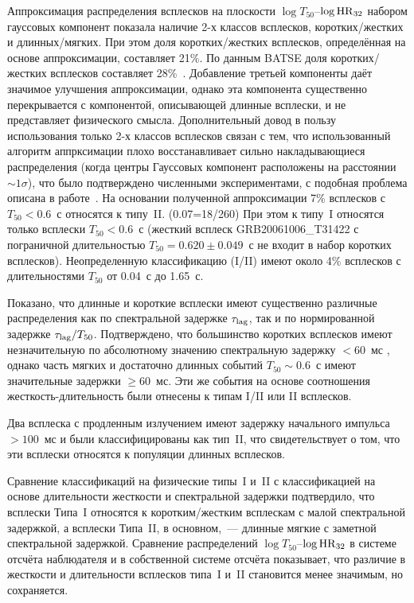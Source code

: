 Аппроксимация распределения всплесков на плоскости $\log T_{50}$--$\log {\mathrm{HR}}_{32}$ 
набором гауссовых компонент показала наличие 2-х классов всплесков, коротких/жестких 
и длинных/мягких. При этом доля коротких/жестких всплесков, определённая на основе 
аппроксимации, составляет 21\%. По данным  BATSE доля коротких/жестких всплесков 
составляет 28\%~\citep{Horvath_2002}.  
Добавление третьей компоненты даёт значимое улучшения аппроксимации, однако эта 
компонента существенно перекрывается с компонентой, описывающей длинные всплески, 
и не представляет физического смысла. Дополнительный довод в пользу использования
только 2-х классов всплесков связан с тем, что использованный алгоритм аппрксимации
плохо восстанавливает сильно накладывающиеся распределения 
(когда центры Гауссовых компонент расположены на расстоянии $\sim 1\sigma$),
что было подтверждено численными экспериментами, с подобная проблема 
описана в работе~\citep{Igoshev_2013MNRAS}.
На основании полученной аппроксимации 7\% всплесков с $T_{50} < 0.6$~с относятся к типу~II.  (0.07=18/260)
При этом к типу~I относятся только всплески $T_{50} < 0.6$~с 
(жесткий всплеск GRB20061006\_T31422 с пограничной  длительностью $T_{50} = 0.620\pm 0.049$~с 
не входит в набор коротких всплесков). Неопределенную классификацию (I/II) имеют 
около 4\% всплесков с длительностями $T_{50}$ от 0.04~с до 1.65~с.
 
Показано, что длинные и короткие всплески имеют существенно различные распределения 
как по спектральной задержке $\tau_{\mathrm{lag}}$, так и по нормированной задержке 
$\tau_{\mathrm{lag}} / T_{50}$. Подтверждено, что большинство коротких всплесков 
имеют незначительную по абсолютному значению спектральную задержку $< 60$~мс , 
однако часть мягких и достаточно длинных событий $T_{50}\sim 0.6$~с имеют 
значительные задержки $\geq 60$~мс. Эти же события на основе соотношения 
жесткость-длительность были отнесены к типам I/II или II всплесков. 

Два всплеска с продленным излучением имеют задержку начального импульса $> 100$~мс
и были классифицированы как тип~II, что свидетельствует о том, что
эти всплески относятся к популяции длинных всплесков.  

Сравнение классификаций на физические типы~I и~II с классификацией на основе 
длительности жесткости и спектральной задержки подтвердило, что всплески Типа~I 
относятся к коротким/жестким всплескам с малой спектральной задержкой, а всплески 
Типа~II, в основном,~--- длинные мягкие с заметной спектральной задержкой. 
Сравнение распределений $\log T_{50}$--$\log {\mathrm{HR}}_{32}$ в системе отсчёта наблюдателя 
и в собственной системе отсчёта показывает, что различие в жесткости и длительности
всплесков типа~I и~II становится менее значимым, но сохраняется.

